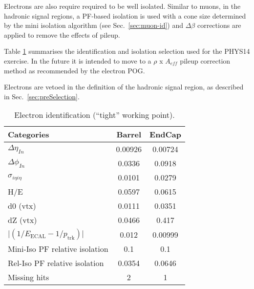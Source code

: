 Electrons are also require required to be well isolated. 
Similar to muons, in the hadronic signal regions, a PF-based isolation \cite{pf-photon} is used with a cone size determined by the mini isolation algorithm (see Sec.~\ref{sec:muon-id}) and $\Delta \beta$ corrections are applied to remove the effects of pileup.

Table \ref{tab:ele-id} summarises the identification and isolation selection used for the PHYS14 exercise. In the future it is intended to move to a $\rho$ x $A_{eff}$ pileup correction method as recommended by the electron POG.

Electrons are vetoed in the definition of the hadronic signal region, 
as described in Sec.~\ref{sec:preSelection}.%


\begin{table}[h!]
  \caption{Electron identification (``tight'' working point).\label{tab:ele-id}}
  \centering
  \footnotesize
  \begin{tabular}{ lcc }
    \hline
    \hline
    Categories                                               & Barrel    & EndCap    \\
    \hline
    $\Delta \eta_{In}$                                       & 0.00926   & 0.00724  \\
    $\Delta \phi_{In}$                                       & 0.0336    & 0.0918  \\
    $\sigma_{i\eta i\eta}$                                   & 0.0101    & 0.0279  \\
    H/E                                                      & 0.0597    & 0.0615   \\
    d0 (vtx)                                                 & 0.0111    & 0.0351  \\
    dZ (vtx)                                                 & 0.0466    & 0.417  \\
    $\lvert(1/E_{\textrm{ECAL}} - 1/p_{\textrm{trk}})\rvert$ & 0.012     & 0.00999  \\
    Mini-Iso PF relative isolation                           & 0.1       & 0.1       \\
    Rel-Iso PF relative isolation                            & 0.0354    & 0.0646       \\
    Missing hits                                             & 2         & 1         \\
    \hline
    \hline
  \end{tabular}
  \end{table}


